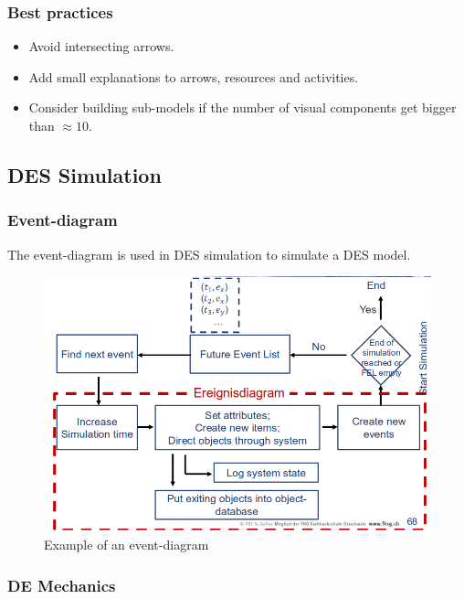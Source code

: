 \subsubsection{Best practices}

\begin{itemize}
	\tightlist
	\item Avoid intersecting arrows.
	\item Add small explanations to arrows, resources and activities.
	\item Consider building sub-models if the number of visual components get
	bigger than $\approx10$.
\end{itemize}


\subsection{DES Simulation}

\subsubsection{Event-diagram}

The event-diagram is used in DES simulation to simulate a DES model.

\begin{figure}[H]
	\centering
	\includegraphics[width=.5\textwidth]{figures/ereignisdiagram.png}
	\caption{Example of an event-diagram}
\end{figure}


\subsubsection{DE Mechanics}


